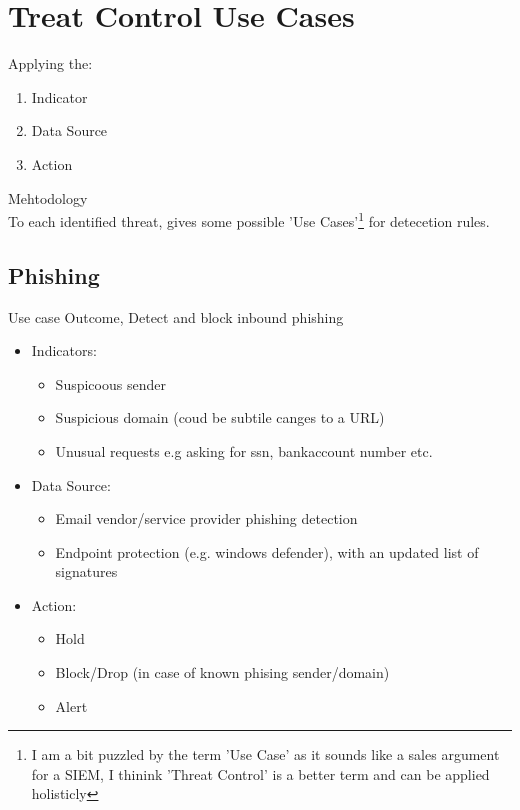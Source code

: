 \documentclass[
	letterpaper, %
	10pt, %
	unnumberedsections, %
	twoside, %
]{APAAssignment}
\begin{document}
\section{Treat Control Use Cases}

Applying the:
\begin{spacing}{1}
	\begin{enumerate}
		\item Indicator
		\item Data Source
		\item Action
	\end{enumerate}
\end{spacing}
Mehtodology \\
To each identified threat, gives some possible 'Use Cases'\footnote{I am a bit puzzled by the term 'Use Case' as it sounds like a sales argument for a SIEM, I thinink 'Threat Control' is a better term and can be applied holisticly} for detecetion rules.

\subsection{Phishing}
Use case Outcome, Detect and block inbound phishing
\begin{spacing}{1}
	\begin{itemize}
		\item Indicators:
		      \begin{itemize}
			      \item Suspicoous sender
			      \item Suspicious domain (coud be subtile canges to a URL)
			      \item Unusual requests e.g asking for ssn, bankaccount number etc.
		      \end{itemize}
		\item Data Source:
		      \begin{itemize}
			      \item Email vendor/service provider phishing detection
			      \item Endpoint protection (e.g. windows defender\cite{WindowsDefenderCommercial}), with an updated list of signatures
		      \end{itemize}
		\item Action:
		      \begin{itemize}
			      \item Hold
			      \item Block/Drop (in case of known phising sender/domain)
			      \item Alert
		      \end{itemize}
	\end{itemize}
\end{spacing}
\end{document}
